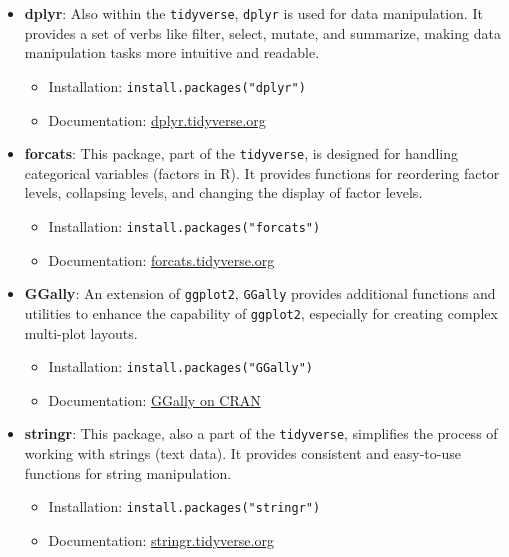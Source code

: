 \documentclass[11pt]{article}\usepackage[]{graphicx}\usepackage[]{xcolor}
\begin{document}
\begin{itemize}
    \item \textbf{dplyr}: Also within the \texttt{tidyverse}, \texttt{dplyr} is used for data manipulation. It provides a set of verbs like filter, select, mutate, and summarize, making data manipulation tasks more intuitive and readable.
    \begin{itemize}
        \item Installation: \texttt{install.packages("dplyr")}
        \item Documentation: \href{https://dplyr.tidyverse.org/}{dplyr.tidyverse.org}
    \end{itemize}
    
    \item \textbf{forcats}: This package, part of the \texttt{tidyverse}, is designed for handling categorical variables (factors in R). It provides functions for reordering factor levels, collapsing levels, and changing the display of factor levels.
    \begin{itemize}
        \item Installation: \texttt{install.packages("forcats")}
        \item Documentation: \href{https://forcats.tidyverse.org/}{forcats.tidyverse.org}
    \end{itemize}
    
    \item \textbf{GGally}: An extension of \texttt{ggplot2}, \texttt{GGally} provides additional functions and utilities to enhance the capability of \texttt{ggplot2}, especially for creating complex multi-plot layouts.
    \begin{itemize}
        \item Installation: \texttt{install.packages("GGally")}
        \item Documentation: \href{https://cran.r-project.org/web/packages/GGally/index.html}{GGally on CRAN}
    \end{itemize}
    
    \item \textbf{stringr}: This package, also a part of the \texttt{tidyverse}, simplifies the process of working with strings (text data). It provides consistent and easy-to-use functions for string manipulation.
    \begin{itemize}
        \item Installation: \texttt{install.packages("stringr")}
        \item Documentation: \href{https://stringr.tidyverse.org/}{stringr.tidyverse.org}
    \end{itemize}
\end{itemize}
\end{document}
